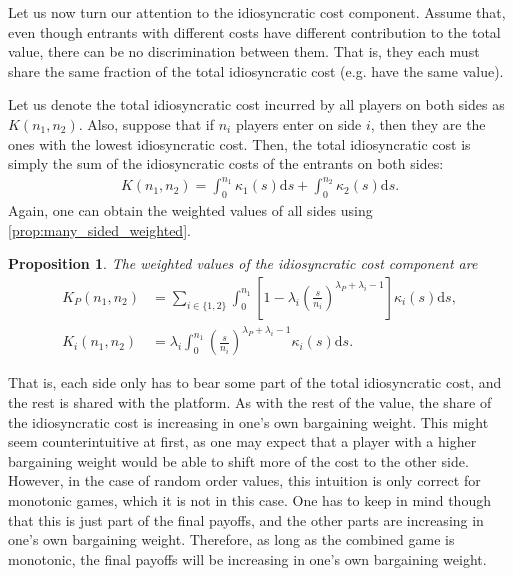 \documentclass[a4paper]{article}
\newtheorem{proposition}{Proposition}
\newcommand{\ds}{\mathrm{d}s}
\begin{document}
Let us now turn our attention to the idiosyncratic cost component.
Assume that, even though entrants with different costs have different contribution to the total value, there can be no discrimination between them.
That is, they each must share the same fraction of the total idiosyncratic cost (e.g. have the same value).

Let us denote the total idiosyncratic cost incurred by all players on both sides as $K(n_1, n_2)$.
Also, suppose that if $n_i$ players enter on side $i$, then they are the ones with the lowest idiosyncratic cost.
Then, the total idiosyncratic cost is simply the sum of the idiosyncratic costs of the entrants on both sides:
\begin{align*}
    K(n_1, n_2) = \int_0^{n_1} \kappa_1(s) \ds + \int_0^{n_2} \kappa_2(s) \ds.
\end{align*}
Again, one can obtain the weighted values of all sides using \cref{prop:many_sided_weighted}.
\begin{proposition}
    \label{prop:platform_bargaining_idiosyncratic}
    The weighted values of the idiosyncratic cost component are
    \begin{align*}
        K_P(n_1, n_2) &= \sum_{i \in \{1, 2\}} \int_0^{n_1} \left[ 1 - \lambda_i \left( \frac{s}{n_i} \right)^{\lambda_P + \lambda_i - 1} \right] \kappa_i(s) \ds, \\
        K_i(n_1, n_2) &= \lambda_i \int_0^{n_1} \left( \frac{s}{n_i} \right)^{\lambda_P + \lambda_i - 1} \kappa_i(s) \ds.
    \end{align*}
\end{proposition}

That is, each side only has to bear some part of the total idiosyncratic cost, and the rest is shared with the platform.
As with the rest of the value, the share of the idiosyncratic cost is increasing in one's own bargaining weight.
This might seem counterintuitive at first, as one may expect that a player with a higher bargaining weight would be able to shift more of the cost to the other side.
However, in the case of random order values, this intuition is only correct for monotonic games, which it is not in this case.
One has to keep in mind though that this is just part of the final payoffs, and the other parts are increasing in one's own bargaining weight.
Therefore, as long as the combined game is monotonic, the final payoffs will be increasing in one's own bargaining weight.
\end{document}
